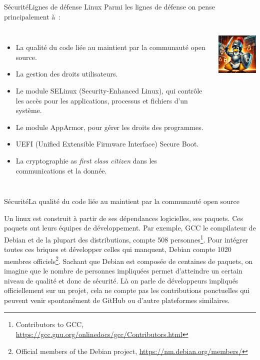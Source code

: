 \documentclass{beamer}
\begin{document}
    \begin{frame}{Sécurité}{Lignes de défense Linux}
        Parmi les lignes de défense on pense principalement à~:
        \begin{columns}
            \begin{itemize}
                \item La qualité du code liée au maintient par la communauté open source.
                \item La gestion des droits utilisateurs.
                \item Le module SELinux (Security-Enhanced Linux), qui contrôle les accès pour les applications, processus et fichiers d'un système.
                \item Le module AppArmor, pour gérer les droits des programmes.
                \item UEFI (Unified Extensible Firmware Interface) Secure Boot.
                \item La cryptographie as \textit{first class citizen} dans les communications et la donnée.
            \end{itemize}
            \centering
            \includegraphics[width=4cm]{image/tux-fighting-attack}
        \end{columns}
    \end{frame}

    \begin{frame}{Sécurité}{La qualité du code liée au maintient par la communauté open source}
        \begin{footnotesize}
            Un linux est construit à partir de ses dépendances logicielles, ses paquets.
            \bigbreak
            Ces paquets ont leurs équipes de développement.
            Par exemple, GCC le compilateur de Debian et de la plupart des distributions, compte 508 personnes\footnote{Contributors to GCC, \url{https://gcc.gnu.org/onlinedocs/gcc/Contributors.html}}.
            \bigbreak
            Pour intégrer toutes ces briques et développer celles qui manquent, Debian compte 1020 membres officiels\footnote{Official members of the Debian project, \url{https://nm.debian.org/members/}}.
            \bigbreak
            Sachant que Debian est composée de centaines de paquets, on imagine que le nombre de personnes impliquées permet d'atteindre un certain niveau de qualité et donc de sécurité.
            \bigbreak
            Là on parle de développeurs impliqués officiellement sur un projet, cela ne compte pas les contributions ponctuelles qui peuvent venir spontanément de GitHub ou d'autre plateformes similaires.
        \end{footnotesize}
    \end{frame}
\end{document}
